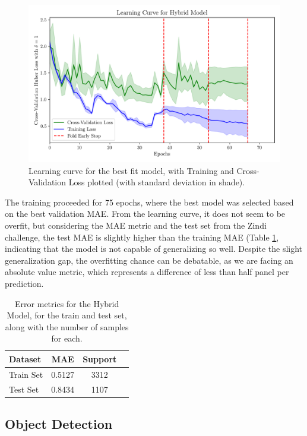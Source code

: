 \documentclass[conference]{IEEEtran}
\begin{document}
\begin{figure}[H]
    \centering
    \includegraphics[width=1\linewidth]{assets/model01_lc.png}
    \caption{Learning curve for the best fit model, with Training and Cross-Validation Loss plotted (with standard deviation in shade).}
    \label{fig:model01_lc}
\end{figure}

The training proceeded for 75 epochs, where the best model was selected based on the best validation MAE. From the learning curve, it does not seem to be overfit, but considering the MAE metric and the test set from the Zindi challenge, the test MAE is slightly higher than the training MAE (Table \ref{tab:model01_results}, indicating that the model is not capable of generalizing so well. Despite the slight generalization gap, the overfitting chance can be debatable, as we are facing an absolute value metric, which represents a difference of less than half panel per prediction. 

\begin{table}[H]
\centering
\caption{Error metrics for the Hybrid Model, for the train and test set, along with the number of samples for each.}
\label{tab:model01_results}
\begin{tabular}{lccc}
\toprule
\textbf{Dataset} & \textbf{MAE} & \textbf{Support} \\
\midrule
Train Set & 0.5127 & 3312 \\
Test Set & 0.8434 & 1107 \\
\bottomrule
\end{tabular}
\end{table}

\subsection{Object Detection}
\end{document}
